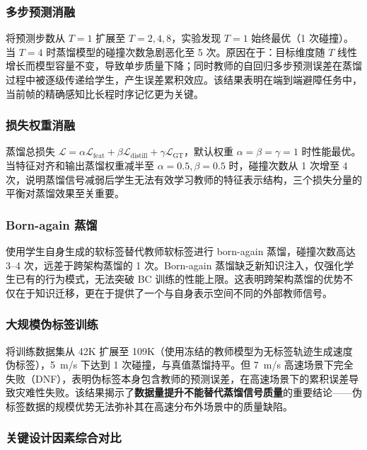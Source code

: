 \documentclass[12pt,a4paper]{article}
\numberwithin{equation}{section}
\numberwithin{figure}{section}
\numberwithin{table}{section}
\begin{document}
\subsubsection{多步预测消融}

将预测步数从 $T=1$ 扩展至 $T=2,4,8$，实验发现 $T=1$ 始终最优（1 次碰撞）。当 $T=4$ 时蒸馏模型的碰撞次数急剧恶化至 5 次。原因在于：目标维度随 $T$ 线性增长而模型容量不变，导致单步质量下降；同时教师的自回归多步预测误差在蒸馏过程中被逐级传递给学生，产生误差累积效应。该结果表明在端到端避障任务中，当前帧的精确感知比长程时序记忆更为关键。

\subsubsection{损失权重消融}

蒸馏总损失 $\mathcal{L} = \alpha\mathcal{L}_{\text{feat}} + \beta\mathcal{L}_{\text{distill}} + \gamma\mathcal{L}_{\text{GT}}$，默认权重 $\alpha=\beta=\gamma=1$ 时性能最优。当特征对齐和输出蒸馏权重减半至 $\alpha=0.5,\beta=0.5$ 时，碰撞次数从 1 次增至 4 次，说明蒸馏信号减弱后学生无法有效学习教师的特征表示结构，三个损失分量的平衡对蒸馏效果至关重要。

\subsubsection{Born-again 蒸馏}

使用学生自身生成的软标签替代教师软标签进行 born-again 蒸馏，碰撞次数高达 3--4 次，远差于跨架构蒸馏的 1 次。Born-again 蒸馏缺乏新知识注入，仅强化学生已有的行为模式，无法突破 BC 训练的性能上限。这表明跨架构蒸馏的优势不仅在于知识迁移，更在于提供了一个与自身表示空间不同的外部教师信号。

\subsubsection{大规模伪标签训练}

将训练数据集从 42K 扩展至 109K（使用冻结的教师模型为无标签轨迹生成速度伪标签），5~m/s 下达到 1 次碰撞，与真值蒸馏持平。但 7~m/s 高速场景下完全失败（DNF），表明伪标签本身包含教师的预测误差，在高速场景下的累积误差导致灾难性失败。该结果揭示了\textbf{数据量提升不能替代蒸馏信号质量}的重要结论——伪标签数据的规模优势无法弥补其在高速分布外场景中的质量缺陷。

\subsubsection{关键设计因素综合对比}
\label{sec:factor-ranking}
\end{document}

